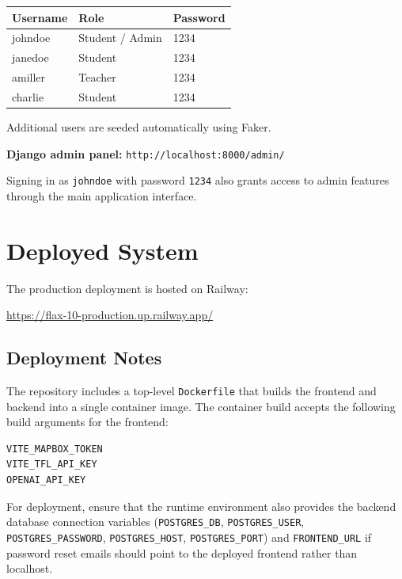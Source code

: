 \documentclass[a4paper, 12pt]{report}
\begin{document}
\begin{center}
\begin{tabular}{lll}
\toprule
\textbf{Username} & \textbf{Role} & \textbf{Password} \\
\midrule
johndoe  & Student / Admin & 1234 \\
janedoe  & Student         & 1234 \\
amiller  & Teacher         & 1234 \\
charlie  & Student         & 1234 \\
\bottomrule
\end{tabular}
\end{center}

Additional users are seeded automatically using Faker.

\bigskip
\textbf{Django admin panel:}
\texttt{http://localhost:8000/admin/}

Signing in as \texttt{johndoe} with password \texttt{1234} also grants
access to admin features through the main application interface.

\chapter{Deployed System}

The production deployment is hosted on Railway:

\begin{center}
\url{https://flax-10-production.up.railway.app/}
\end{center}

\section{Deployment Notes}

The repository includes a top-level \texttt{Dockerfile} that builds the
frontend and backend into a single container image. The container build
accepts the following build arguments for the frontend:

\begin{lstlisting}[language=bash]
VITE_MAPBOX_TOKEN
VITE_TFL_API_KEY
OPENAI_API_KEY
\end{lstlisting}

For deployment, ensure that the runtime environment also provides the
backend database connection variables
(\texttt{POSTGRES\_DB}, \texttt{POSTGRES\_USER},
\texttt{POSTGRES\_PASSWORD}, \texttt{POSTGRES\_HOST},
\texttt{POSTGRES\_PORT}) and \texttt{FRONTEND\_URL} if password reset
emails should point to the deployed frontend rather than localhost.
\end{document}
